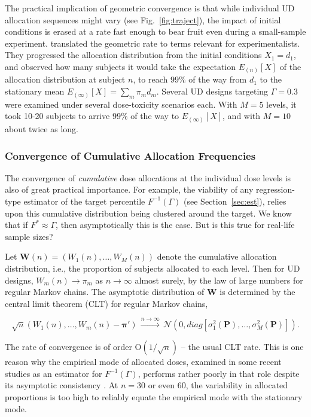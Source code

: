 The practical implication of geometric convergence is that while individual UD allocation sequences might vary (see Fig.~\ref{fig:traject}), the impact of initial conditions is erased at a rate fast enough to bear fruit even during a small-sample experiment. \cite{Oron:Hoff:thek:2009} translated the geometric rate to terms relevant for experimentalists. They progressed the allocation distribution from the initial conditions $X_1=d_1$, and observed how many subjects it would take the expectation $E_{(n)}[X]$ of the allocation distribution at subject $n$,  to reach $99\%$ of the way from $d_1$ to the stationary mean $E_{(\infty)}[X]=\sum_m \pi_m d_m$. Several UD designs targeting $\Gamma=0.3$ were examined under several dose-toxicity scenarios each. With $M=5$ levels, it took 10-20 subjects to arrive $99\%$ of the way to $E_{(\infty)}[X]$, and with $M=10$ about twice as long.

\subsubsection{Convergence of Cumulative Allocation Frequencies}\label{sec:asymvar}

The convergence of \emph{cumulative} dose allocations at the individual dose levels is also of great practical importance. For example, the viability of any regression-type estimator of the target percentile $F^{-1}(\Gamma)$ (see Section~\ref{sec:est}), relies upon this cumulative distribution being clustered around the target. We know that if $F^*\approx\Gamma$, then asymptotically this is the case. But is this true for real-life sample sizes?

Let $\mathbf{W}(n)=\left(W_1(n),\ldots ,W_M(n)\right)$ denote the cumulative allocation distribution, i.e., the proportion of subjects allocated to each level. Then for UD designs, $W_m(n)\to\pi_m$ as $n\rightarrow \infty$ almost surely, by the law of large numbers for regular Markov chains. The asymptotic distribution of $\mathbf{W}$ is determined by the central limit theorem (CLT) for regular Markov chains,

\begin{equation}\label{eq:CLT}
\sqrt{n}\left(W_1(n),\ldots, W_m(n)-\boldsymbol{\pi}\prime\right)\,\stackrel{n
\rightarrow \infty}{\longrightarrow}
\,\mathcal{N}\left(0,diag\left[\sigma_1^2(\mathbf{P})
,\ldots ,\sigma_M^2(\mathbf{P})\right] \right).
\end{equation}

The rate of convergence is of order $\mathrm{O}\left(1/\sqrt{n}\right)$ -- the usual CLT rate. This is one reason why the empirical mode of allocated doses, examined in some recent studies as an estimator for $F^{-1}(\Gamma)$, performs rather poorly in that role despite its asymptotic consistency \citep{Giov:Pint:Pint:prop:1998}. At $n=30$ or even $60$, the variability in allocated proportions is too high to reliably equate the empirical mode with the stationary mode. 

